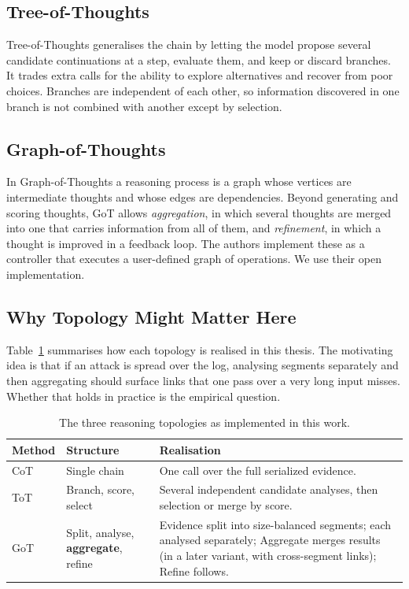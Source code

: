 \documentclass[a4paper, 12pt]{report}
\theoremstyle{definition}
\begin{document}
\subsection{Tree-of-Thoughts}
Tree-of-Thoughts \cite{yao2023tot} generalises the chain by letting the model propose several candidate continuations at a step, evaluate them, and keep or discard branches. It trades extra calls for the ability to explore alternatives and recover from poor choices. Branches are independent of each other, so information discovered in one branch is not combined with another except by selection.

\subsection{Graph-of-Thoughts}
In Graph-of-Thoughts \cite{besta2024got} a reasoning process is a graph whose vertices are intermediate thoughts and whose edges are dependencies. Beyond generating and scoring thoughts, GoT allows \emph{aggregation}, in which several thoughts are merged into one that carries information from all of them, and \emph{refinement}, in which a thought is improved in a feedback loop. The authors implement these as a controller that executes a user-defined graph of operations. We use their open implementation.

\subsection{Why Topology Might Matter Here}
Table~\ref{tab:topo} summarises how each topology is realised in this thesis. The motivating idea is that if an attack is spread over the log, analysing segments separately and then aggregating should surface links that one pass over a very long input misses. Whether that holds in practice is the empirical question.

\begin{table}[h]
\centering
\caption{The three reasoning topologies as implemented in this work.}
\label{tab:topo}
\begin{tabular}{p{2.2cm}p{4.2cm}p{7.5cm}}
\toprule
Method & Structure & Realisation \\
\midrule
CoT & Single chain & One call over the full serialized evidence. \\
ToT & Branch, score, select & Several independent candidate analyses, then selection or merge by score. \\
GoT & Split, analyse, \textbf{aggregate}, refine & Evidence split into size-balanced segments; each analysed separately; Aggregate merges results (in a later variant, with cross-segment links); Refine follows. \\
\bottomrule
\end{tabular}
\end{table}
\end{document}
